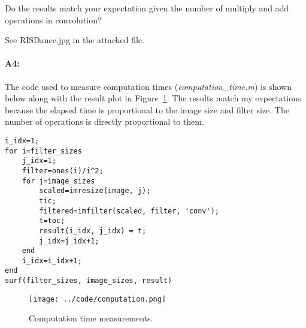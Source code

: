 	Do the results match your expectation given the number of multiply and add operations in convolution?
	
	See RISDance.jpg in the attached file.
	
	\paragraph{A4:} The code used to measure computation times (\emph{computation\_time.m}) is shown below along with the result plot in Figure~\ref{fig:result3}. The results match my expectations because the elapsed time is proportional to the image size and filter size. The number of operations is directly proportional to them.
	\begin{lstlisting}[style=Matlab-editor]
% ... initializations ...
i_idx=1;
for i=filter_sizes
    j_idx=1;
    filter=ones(i)/i^2;
    for j=image_sizes
        scaled=imresize(image, j);
        tic;
        filtered=imfilter(scaled, filter, 'conv');
        t=toc;
        result(i_idx, j_idx) = t;
        j_idx=j_idx+1;
    end
    i_idx=i_idx+1;
end
surf(filter_sizes, image_sizes, result)
	\end{lstlisting}
	\begin{figure}[h!]
		\centering
		\texttt{[image: ../code/computation.png]}
		\caption{Computation time measurements.}
		\label{fig:result3}
	\end{figure}
	
	
	
	
	
	
	
	
